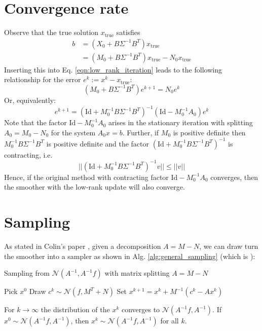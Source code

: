 \documentclass[11pt]{article}
\newcommand{\xtrue}{x_{\text{true}}}
\begin{document}
\section{Convergence rate}
Observe that the true solution $\xtrue$ satisfies
\begin{equation}
    \begin{aligned}
        b & = (X_0 + B\Sigma^{-1}B^T)\xtrue               \\
          & = (M_0 + B\Sigma^{-1}B^T) \xtrue - N_0 \xtrue
    \end{aligned}
\end{equation}
Inserting this into Eq. \eqref{eqn:low_rank_iteration} leads to the following relationship for the error $e^k:= x^k-\xtrue$:
\begin{equation}
    (M_0 + B\Sigma^{-1}B^T)e^{k+1} = N_0 e^k
\end{equation}
Or, equivalently:
\begin{equation}
    e^{k+1} = \left(\text{Id} + M_0^{-1}B\Sigma^{-1}B^T \right)^{-1} \left(\text{Id}-M_0^{-1}A_0\right) e^k
\end{equation}
Note that the factor $\text{Id} - M_0^{-1}A_0$ arises in the stationary iteration with splitting $A_0=M_0-N_0$ for the system $A_0x=b$. Further, if $M_0$ is positive definite then $M_0^{-1}B\Sigma^{-1}B^T $ is positive definite and the factor $\left(\text{Id} + M_0^{-1}B\Sigma^{-1}B^T \right)^{-1}$ is contracting, i.e.
\begin{equation}
    ||\left(\text{Id} + M_0^{-1}B\Sigma^{-1}B^T \right)^{-1}v|| \le ||v||
\end{equation}
Hence, if the original method with contracting factor $\text{Id} - M_0^{-1}A_0$ converges, then the smoother with the low-rank update will also converge.
\section{Sampling}
As stated in Colin's paper \cite{Fox2017}, given a decomposition $A=M-N$, we can draw turn the smoother into a sampler as shown in Alg. \ref{alg:general_sampling} (which is \cite[Algorithm 5]{Fox2017}):
\begin{algorithm}
    \caption{Sampling from $\mathcal{N}(A^{-1},A^{-1}f)$ with matrix splitting $A=M-N$}\label{alg:general_sampling}
    \begin{algorithmic}[1]
        \State Pick $x^0$
        \State Draw $c^k\sim\mathcal{N}(f,M^T+N)$
        \State Set $x^{k+1} = x^{k} + M^{-1}\left(c^k - Ax^k \right)$
        \EndFor
    \end{algorithmic}
\end{algorithm}
For $k\rightarrow \infty$ the distribution of the $x^k$ converges to $\mathcal{N}(A^{-1}f,A^{-1})$. If $x^0\sim\mathcal{N}(A^{-1}f,A^{-1})$, then $x^k\sim \mathcal{N}(A^{-1}f,A^{-1})$ for all $k$.
\end{document}
